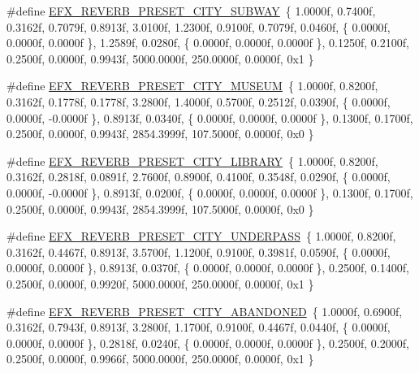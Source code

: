 \begin{DoxyCompactItemize}
\item 
\#define \mbox{\hyperlink{efx-presets_8h_ad8fff58ad71c8bdac17504c3f8417ed1}{E\+F\+X\+\_\+\+R\+E\+V\+E\+R\+B\+\_\+\+P\+R\+E\+S\+E\+T\+\_\+\+C\+I\+T\+Y\+\_\+\+S\+U\+B\+W\+AY}}~\{ 1.\+0000f, 0.\+7400f, 0.\+3162f, 0.\+7079f, 0.\+8913f, 3.\+0100f, 1.\+2300f, 0.\+9100f, 0.\+7079f, 0.\+0460f, \{ 0.\+0000f, 0.\+0000f, 0.\+0000f \}, 1.\+2589f, 0.\+0280f, \{ 0.\+0000f, 0.\+0000f, 0.\+0000f \}, 0.\+1250f, 0.\+2100f, 0.\+2500f, 0.\+0000f, 0.\+9943f, 5000.\+0000f, 250.\+0000f, 0.\+0000f, 0x1 \}
\item 
\#define \mbox{\hyperlink{efx-presets_8h_a9c70e815312e934808217c272af2c5d7}{E\+F\+X\+\_\+\+R\+E\+V\+E\+R\+B\+\_\+\+P\+R\+E\+S\+E\+T\+\_\+\+C\+I\+T\+Y\+\_\+\+M\+U\+S\+E\+UM}}~\{ 1.\+0000f, 0.\+8200f, 0.\+3162f, 0.\+1778f, 0.\+1778f, 3.\+2800f, 1.\+4000f, 0.\+5700f, 0.\+2512f, 0.\+0390f, \{ 0.\+0000f, 0.\+0000f, -\/0.\+0000f \}, 0.\+8913f, 0.\+0340f, \{ 0.\+0000f, 0.\+0000f, 0.\+0000f \}, 0.\+1300f, 0.\+1700f, 0.\+2500f, 0.\+0000f, 0.\+9943f, 2854.\+3999f, 107.\+5000f, 0.\+0000f, 0x0 \}
\item 
\#define \mbox{\hyperlink{efx-presets_8h_a1eb92f39ddc21de882008a114afd6a5a}{E\+F\+X\+\_\+\+R\+E\+V\+E\+R\+B\+\_\+\+P\+R\+E\+S\+E\+T\+\_\+\+C\+I\+T\+Y\+\_\+\+L\+I\+B\+R\+A\+RY}}~\{ 1.\+0000f, 0.\+8200f, 0.\+3162f, 0.\+2818f, 0.\+0891f, 2.\+7600f, 0.\+8900f, 0.\+4100f, 0.\+3548f, 0.\+0290f, \{ 0.\+0000f, 0.\+0000f, -\/0.\+0000f \}, 0.\+8913f, 0.\+0200f, \{ 0.\+0000f, 0.\+0000f, 0.\+0000f \}, 0.\+1300f, 0.\+1700f, 0.\+2500f, 0.\+0000f, 0.\+9943f, 2854.\+3999f, 107.\+5000f, 0.\+0000f, 0x0 \}
\item 
\#define \mbox{\hyperlink{efx-presets_8h_a9f13c8083a74def4b4b47e5c9b59dbed}{E\+F\+X\+\_\+\+R\+E\+V\+E\+R\+B\+\_\+\+P\+R\+E\+S\+E\+T\+\_\+\+C\+I\+T\+Y\+\_\+\+U\+N\+D\+E\+R\+P\+A\+SS}}~\{ 1.\+0000f, 0.\+8200f, 0.\+3162f, 0.\+4467f, 0.\+8913f, 3.\+5700f, 1.\+1200f, 0.\+9100f, 0.\+3981f, 0.\+0590f, \{ 0.\+0000f, 0.\+0000f, 0.\+0000f \}, 0.\+8913f, 0.\+0370f, \{ 0.\+0000f, 0.\+0000f, 0.\+0000f \}, 0.\+2500f, 0.\+1400f, 0.\+2500f, 0.\+0000f, 0.\+9920f, 5000.\+0000f, 250.\+0000f, 0.\+0000f, 0x1 \}
\item 
\#define \mbox{\hyperlink{efx-presets_8h_aa925be10a695b71b4e10175ea5a1e1e0}{E\+F\+X\+\_\+\+R\+E\+V\+E\+R\+B\+\_\+\+P\+R\+E\+S\+E\+T\+\_\+\+C\+I\+T\+Y\+\_\+\+A\+B\+A\+N\+D\+O\+N\+ED}}~\{ 1.\+0000f, 0.\+6900f, 0.\+3162f, 0.\+7943f, 0.\+8913f, 3.\+2800f, 1.\+1700f, 0.\+9100f, 0.\+4467f, 0.\+0440f, \{ 0.\+0000f, 0.\+0000f, 0.\+0000f \}, 0.\+2818f, 0.\+0240f, \{ 0.\+0000f, 0.\+0000f, 0.\+0000f \}, 0.\+2500f, 0.\+2000f, 0.\+2500f, 0.\+0000f, 0.\+9966f, 5000.\+0000f, 250.\+0000f, 0.\+0000f, 0x1 \}

\end{DoxyCompactItemize}
